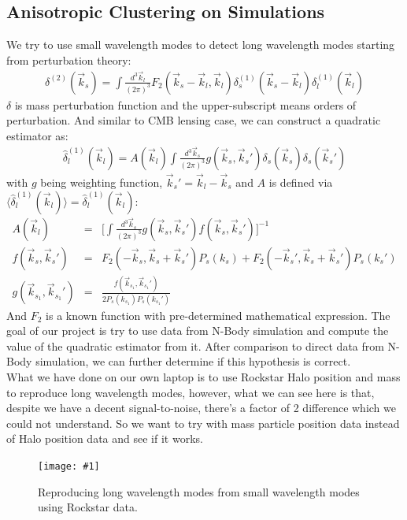 \documentclass[12pt]{article}
\newcommand{\sfig}[2]{
\begin{center}
\texttt{[image: \#1]}
\end{center}
        }
\newcommand{\Spng}[2]{
    \begin{figure}[htb]
    \sfig{#1.png}{.9\columnwidth}
    \caption{{\small #2}}
    \label{fig:#1}
    \end{figure}
}
\begin{document}
\begin{small}
\subsection{Anisotropic Clustering on Simulations}
We try to use small wavelength modes to detect long wavelength modes starting from perturbation theory:
\begin{eqnarray}
\delta^{(2)}(\vec{k}_s)=\int\frac{d^{3}\vec{k}_l}{(2 \pi)^3}F_2(\vec{k}_s-\vec{k}_l,\vec{k}_l)\delta_{s}^{(1)}(\vec{k}_s-\vec{k}_l)\delta_l^{(1)}(\vec{k}_l)
\end{eqnarray}
$\delta$ is mass perturbation function and the upper-subscript means orders of perturbation. And similar to CMB lensing case, we can construct a quadratic estimator as:
\begin{eqnarray}
\hat{\delta}_l^{(1)}(\vec{k}_l)=A(\vec{k}_l)\int \frac{d^3 \vec{k}_s}{(2\pi)^3} g(\vec{k}_s,\vec{k}_s')\delta_s(\vec{k}_s)\delta_s(\vec{k}_s')
\end{eqnarray}
with $g$ being weighting function, $\vec{k}_s'=\vec{k}_l-\vec{k}_s$ and $A$ is defined via $\langle \hat{\delta}_l^{(1)}(\vec{k}_l) \rangle=\hat{\delta}_l^{(1)}(\vec{k}_l)$:
\begin{eqnarray}
A(\vec{k}_l)&=&\bigg[\int \frac{d^3 \vec{k}_s}{(2\pi)^3} g(\vec{k}_s,\vec{k}_s')f(\vec{k}_s,\vec{k}_s')  \bigg]^{-1} \\
f(\vec{k}_s,\vec{k}_s')&=&F_2(-\vec{k}_s,\vec{k}_s+\vec{k}_s')P_s(k_s)+F_2(-\vec{k}_s',\vec{k}_s+\vec{k}_s')P_s(k_s') \\
g(\vec{k}_{s_1},\vec{k}_{s_1}')&=&\frac{f(\vec{k}_{s_1},\vec{k}_{s_1}')}{2P_s(k_{s_1})P_s(k_{s_1}')}
\end{eqnarray}
And $F_2$ is a known function with pre-determined mathematical expression. The goal of our project is try to use data from N-Body simulation and compute the value of the quadratic estimator from it. After comparison to direct data from N-Body simulation, we can further determine if this hypothesis is correct.\\
What we have done on our own laptop is to use Rockstar Halo position and mass to reproduce long wavelength modes, however, what we can see here is that, despite we have a decent signal-to-noise, there's a factor of 2 difference which we could not understand. So we want to try with mass particle position data instead of Halo position data and see if it works. \\
\Spng{nbody}{Reproducing long wavelength modes from small wavelength modes using Rockstar data.}



\end{small}
\end{document}
